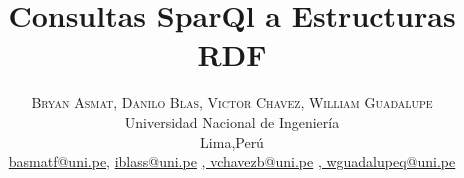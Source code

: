 \documentclass[conference]{IEEEtran}
\begin{document}
\title{\bf{Consultas SparQl a Estructuras RDF}}

\author{%
\textsc{Bryan Asmat}\textsc{, Danilo Blas}\textsc{, Victor Chavez}\textsc{, William Guadalupe}\\
\normalsize Universidad Nacional de Ingeniería \\ %
\normalsize Lima,Perú \\ %
\normalsize \href{mailto:basmatf@uni.pe}{basmatf@uni.pe},  \href{mailto:iblass@uni.pe}{iblass@uni.pe} \href{mailto:vchavezb@uni.pe}{,  vchavezb@uni.pe} \href{mailto:wguadalupeq@uni.pe}{,  wguadalupeq@uni.pe} %
}





\maketitle
\end{document}

